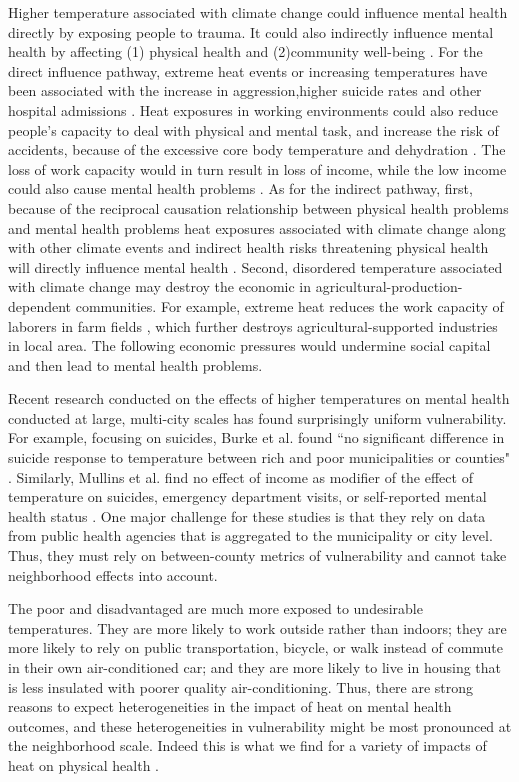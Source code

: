 \documentclass{article}
\begin{document}
Higher temperature associated with climate change could influence mental health directly by exposing people to trauma. It could also indirectly influence mental health by affecting (1) physical health and (2)community well-being \citep{RN1314}. For the direct influence pathway, extreme heat events or increasing temperatures have been associated with the increase in aggression,higher suicide rates and other hospital admissions \citep{RN1314,RN1316,RN1317,RN1318}. Heat exposures in working environments could also reduce people's capacity to deal with physical and mental task, and increase the risk of accidents, because of the excessive core body temperature and dehydration \citep{RN1319,RN1320,RN1321,RN1322}. The loss of work capacity would in turn result in loss of income, while the low income could also cause mental health problems \citep{Katz1997}.  As for the indirect pathway, first, because of the reciprocal causation relationship between physical health problems and mental health problems \citep{RN1323,RN1324} heat exposures associated with climate change along with other climate events and indirect health risks threatening physical health will directly influence mental health \citep{RN1325,RN1326}. Second, disordered temperature associated with climate change may destroy the economic in agricultural-production-dependent communities. For example, extreme heat reduces the work capacity of laborers in farm fields \citep{RN1320}, which further destroys agricultural-supported industries in local area\citep{RN1327}. The following economic pressures would undermine social capital and then lead to mental health problems.

Recent research conducted on the effects of higher temperatures on mental health conducted at large, multi-city scales has found surprisingly uniform vulnerability.  For example, focusing on suicides, Burke et al. found ``no significant difference in suicide response to temperature between rich and poor municipalities or counties" \cite{Burke2018Aug}.  Similarly, Mullins et al. find no effect of income as modifier of the effect of temperature on suicides, emergency department visits, or self-reported mental health status \cite{Mullins2019Dec}.  One major challenge for these studies is that they rely on data from public health agencies that is aggregated to the municipality or city level.  Thus, they must rely on between-county metrics of vulnerability and cannot take neighborhood effects into account.

The poor and disadvantaged are much more exposed to undesirable temperatures.  They are more likely to work outside rather than indoors; they are more likely to rely on public transportation, bicycle, or walk instead of commute in their own air-conditioned car; and they are more likely to live in housing that is less insulated with poorer quality air-conditioning.  Thus, there are strong reasons to expect heterogeneities in the impact of heat on mental health outcomes, and these heterogeneities in vulnerability might be most pronounced at the neighborhood scale.  Indeed this is what we find for a variety of impacts of heat on physical health  \cite{Belanger2015Mar, Uejio2011Mar}.
\end{document}

